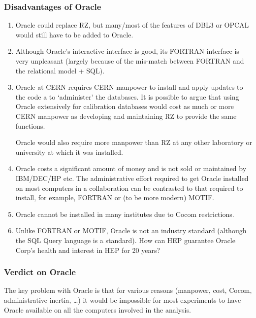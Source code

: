 \subsubsection{Disadvantages of Oracle}
\begin{enumerate}
\item
Oracle could replace RZ, but many/most of the features of DBL3 or OPCAL
would still have to be added to Oracle.
\item
Although Oracle's interactive interface is good, its FORTRAN interface is
very unpleasant (largely because of the mis-match between FORTRAN and
the relational model + SQL).
\item
Oracle at CERN requires CERN manpower to install and apply updates to the code a
to `administer' the databases.  It is possible to argue that using Oracle
extensively for calibration databases would cost as much or more CERN
manpower as developing and maintaining RZ to provide the same functions.

Oracle would also require more manpower than
RZ at any other laboratory or university at which it was installed.
\item
Oracle costs a significant amount of money and is not sold or maintained by
IBM/DEC/HP etc.  The administrative effort required to get Oracle installed on most
computers in a collaboration can be contrasted to that required to install,
for example, FORTRAN or (to be more modern) MOTIF.
\item
Oracle cannot be installed in many institutes due to Cocom restrictions.
\item
Unlike FORTRAN or MOTIF, Oracle is not an industry standard (although
the SQL Query language is a standard).  How can HEP guarantee Oracle
Corp's health and interest in HEP for 20 years?
\end{enumerate}

\subsubsection{Verdict on Oracle}
The key problem with Oracle is that for various reasons (manpower, cost,
Cocom, administrative inertia, \ldots ) it would be impossible for most
experiments to have Oracle available on all the computers involved
in the analysis.







